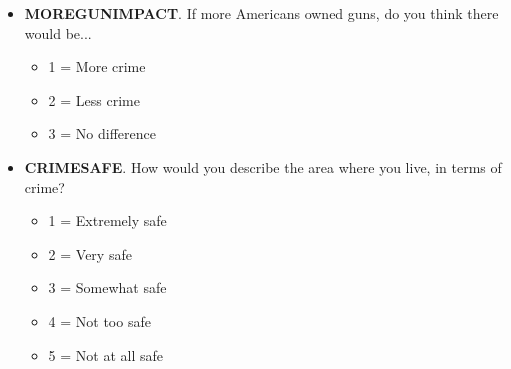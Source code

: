 \documentclass[11pt]{article}
\begin{document}
\begin{itemize}
    \item \textbf{MOREGUNIMPACT}. If more Americans owned guns, do you think there would be...
    \begin{itemize}
        \item 1 = More crime
        \item 2 = Less crime
        \item 3 = No difference
    \end{itemize}

    \item \textbf{CRIMESAFE}. How would you describe the area where you live, in terms of crime?
    \begin{itemize}
        \item 1 = Extremely safe
        \item 2 = Very safe
        \item 3 = Somewhat safe
        \item 4 = Not too safe
        \item 5 = Not at all safe
    \end{itemize}
\end{itemize}
\end{document}
